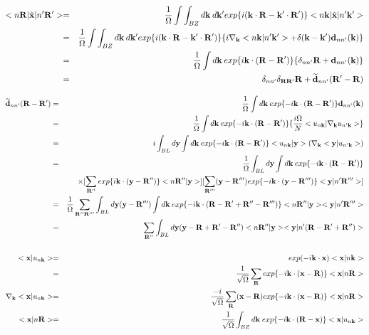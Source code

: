 \documentclass[aps,prb,preprint]{revtex4-1}
\begin{document}
\begin{appendix}
\begin{eqnarray}
 < n{\bf R}| \hat{\bf x} |n'{\bf R'}> = && \frac{1}{\Omega} \int \int_{BZ} d{\bf k} \:d{\bf k'} exp\{i ({\bf k} \cdot {\bf R}- {\bf k'} \cdot {\bf R'} ) \}< n{\bf k}| \hat{\bf x} |n'{\bf k'}>  \nonumber \\
= &&\frac{1}{\Omega}  \int \int_{BZ} d{\bf k} \:d{\bf k'} exp\{i ({\bf k} \cdot {\bf R}- {\bf k'} \cdot {\bf R'} ) \} \{ i \nabla_{\bf k} <n{\bf k}|n'{\bf k'}> + \delta({\bf k-k'}) {\bf d}_{nn'}({\bf k}) \} \nonumber \\
= &&\frac{1}{\Omega} \int d{\bf k} \: exp\{i{\bf k} \cdot ({\bf R- R'} ) \}\{ \delta_{nn'} {\bf R}  + {\bf d}_{nn'}({\bf k}) \} \\
= && \delta_{nn'} \delta_{\bf RR'} {\bf R}  + {\bf \widetilde d}_{nn'}({\bf R'-R})  \\
\end{eqnarray} 

\begin{eqnarray}
 \widetilde{\bf d}_{nn'}({\bf R-R'} ) =&& \frac{1}{\Omega} \int d{\bf k} \: exp\{ -i{\bf k} \cdot ({\bf R-R'}) \} {\bf d}_{nn'}({\bf k}) \nonumber \\
 =&& \frac{1}{\Omega} \int d{\bf k} \: exp\{ -i{\bf k} \cdot ({\bf R-R'}) \}\{ \frac{i \Omega}{N} <u_{n{\bf k}}|\nabla_{\bf k} u_{n'{\bf k}}>  \}\nonumber \\
 =&& i \int_{BL} d{\bf y} \int d{\bf k}\: exp\{ -i{\bf k} \cdot ({\bf R-R'}) \} <u_{n{\bf k}}|{\bf y}> (\nabla_{\bf k}<{\bf y} |u_{n'{\bf k}}> )\nonumber \\
 =&& \frac{1}{\Omega} \int_{BL} d{\bf y} \int d{\bf k}\: exp\{ -i{\bf k} \cdot ({\bf R-R'}) \} \nonumber \\
&& \times [\sum_{\bf R''} exp\{ i{\bf k} \cdot ({\bf y-R''} )\} <n{\bf R''}|{\bf y}> ] [ \sum_{\bf R'''} ({\bf y-R'''}) exp\{-i{\bf k} \cdot ({\bf y-R'''} )\}< {\bf y} |n'{\bf R'''}> ] \nonumber \\
 =&& \frac{1}{\Omega} \sum_{\bf R''R'''}  \int_{BL} d{\bf y} ({\bf y-R'''}) \int d{\bf k}\: exp\{ -i{\bf k} \cdot ({\bf R-R'+R''-R'''}) \} <n{\bf R''}|{\bf y}> < {\bf y} |n'{\bf R'''}>  \nonumber \\
  =&& \sum_{\bf R''}  \int_{BL} d{\bf y} ({\bf y-R+R'-R''}) <n{\bf R''}|{\bf y}> < {\bf y} |n'{\bf (R-R'+R'')}>  \nonumber \\
 \nonumber \\
  < {\bf x}|u_{n{\bf k}}> =&& exp(-i{\bf k} \cdot {\bf x} )< {\bf x}|n{\bf k}> \nonumber \\
=&& \frac{1}{\sqrt{\Omega}} \sum_{\bf R} exp\{-i{\bf k} \cdot ({\bf x-R} )\}< {\bf x} |n{\bf R}> \\
 \nabla_{\bf k} < {\bf x}|u_{n{\bf k}}> =&& \frac{-i}{\sqrt{\Omega}} \sum_{\bf R} ({\bf x-R}) exp\{-i{\bf k} \cdot ({\bf x-R} )\}< {\bf x} |n{\bf R}>\\
 <{\bf x}|n{\bf R}>=&& \frac{1}{\sqrt{\Omega}} \int_{BZ} d{\bf k} \; exp\{-i{\bf k} \cdot ({\bf R- x})\}<{\bf x}|u_{n{\bf k}}> 
\end{eqnarray}


\end{appendix}
\end{document}
